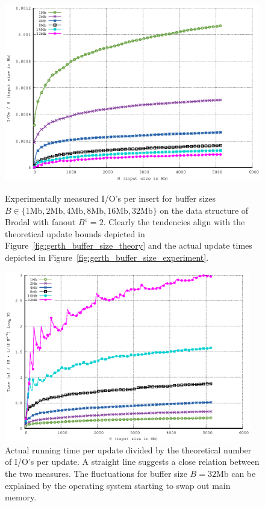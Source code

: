\documentclass[twoside,11pt,openright]{report}
\def \epsilon {\varepsilon}
\begin{document}
\begin{figure}[htp]
\centering
\includegraphics[width=\textwidth]{../src/experiments/gerth_buffer_size_experiment_results/2016-05-03.13_51_54/io_per_insert}
\caption{Experimentally measured I/O's per insert for buffer sizes \\ $B \in \{1 \text{Mb}, 2 \text{Mb}, 4 \text{Mb}, 8 \text{Mb}, 16 \text{Mb}, 32 \text{Mb} \}$ on the data structure of Brodal with fanout $B^\epsilon = 2$. Clearly the tendencies align with the theoretical update bounds depicted in Figure~\ref{fig:gerth_buffer_size_theory} and the actual update times depicted in Figure~\ref{fig:gerth_buffer_size_experiment}.}
\label{fig:gerth_buffer_size_experiment_ios_per_insert}

\includegraphics[width=0.96\textwidth]{../src/experiments/gerth_buffer_size_experiment_results/2016-05-03.13_51_54/time_divided_asymptotic}
\caption{Actual running time per update divided by the theoretical number of I/O's per update. A straight line suggests a close relation between the two measures. The fluctuations for buffer size $B = 32 \text{Mb}$ can be explained by the operating system starting to swap out main memory.}
\label{fig:gerth_buffer_size_experiment_time_divided_asymptotic}
\end{figure}
\end{document}
